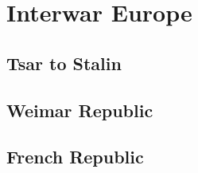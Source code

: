 \chapter{Interwar Europe}

\section{Tsar to Stalin}

\section{Weimar Republic}

\section{French Republic}
